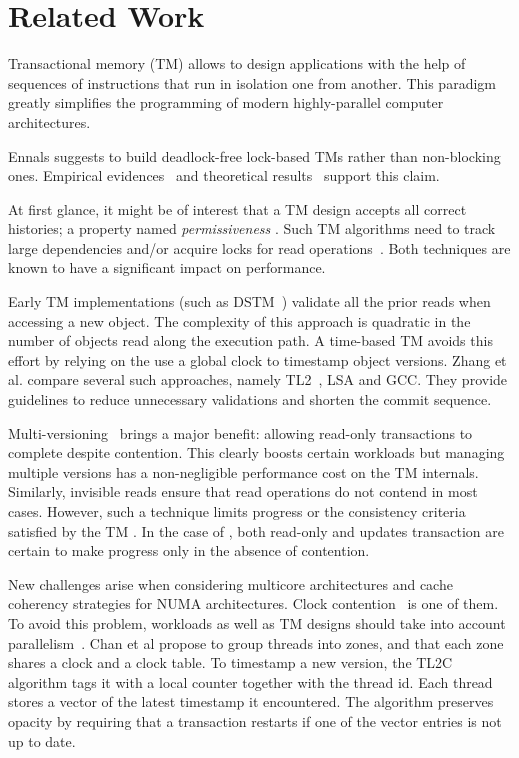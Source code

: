 \section{Related Work}

Transactional memory (TM) allows to design applications with the help of sequences of instructions that run in isolation one from another.
This paradigm greatly simplifies the programming of modern highly-parallel computer architectures.

Ennals \cite{emals} suggests to build deadlock-free lock-based TMs rather than non-blocking ones.
Empirical evidences~\cite{dice06} and theoretical results~\cite{Guerraoui:2008,KuznetsovR15} support this claim.

At first glance, it might be of interest that a TM design accepts all correct histories; a property named \emph{permissiveness} \cite{guerraoui08}.
Such TM algorithms need to track large dependencies \cite{Keidar:2009} and/or acquire locks for read operations~\cite{attiya2012single}.
Both techniques are known to have a significant impact on performance.

Early TM implementations (such as DSTM~\cite{herlihy2003software}) validate all the prior reads when accessing a new object.
The complexity of this approach is quadratic in the number of objects read along the execution path.
A time-based TM avoids this effort by relying on the use a global clock to timestamp object versions.
Zhang et al. \cite{zhang2008commit} compare several such approaches, namely TL2~\cite{dice2006transactional}, LSA \cite{riegel2006lazy} and GCC\cite{spear2006conflict}.
They provide guidelines to reduce unnecessary validations and shorten the commit sequence.

Multi-versioning~\cite{Fernandes:2011, Diegues:2014} brings a major benefit: allowing read-only transactions to complete despite contention.
This clearly boosts certain workloads but managing multiple versions has a non-negligible performance cost on the TM internals.
Similarly, invisible reads ensure that read operations do not contend in most cases.
However, such a technique limits progress or the consistency criteria satisfied by the TM \cite{Attiya:2009}.
In the case of , both read-only and updates transaction are certain to make progress only in the absence of contention.

New challenges arise when considering multicore architectures and cache coherency strategies for NUMA architectures.
Clock contention~\cite{6121290} is one of them.
To avoid this problem, workloads as well as TM designs should take into account parallelism~\cite{Nguyen:2017}.
Chan et al \cite{6121290} propose to group threads into zones, and that each zone shares a clock and a clock table.
To timestamp a new version, the TL2C algorithm \cite{Avni:2008} tags it with a local counter together with the thread id.
Each thread stores a vector of the latest timestamp it encountered.
The algorithm preserves opacity by requiring that a transaction restarts if one of the vector entries is not up to date.

